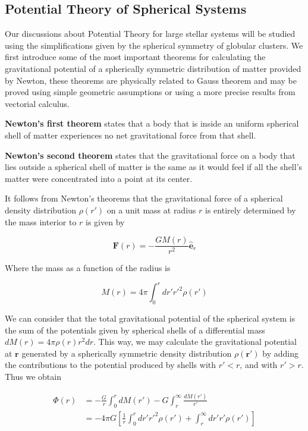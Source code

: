 \subsection{Potential Theory of Spherical Systems}

Our discussions about Potential Theory for large stellar systems will be studied using the simplifications given by the spherical symmetry of globular clusters. We first introduce some of the most important theorems for calculating the gravitational potential of a spherically symmetric distribution of matter provided by Newton, these theorems are physically related to Gauss theorem and may be proved using simple geometric assumptions or using a more precise results from vectorial calculus.

\textbf{Newton's first theorem} states that a body that is inside an uniform spherical shell of matter experiences no net gravitational force from that shell. 

\textbf{Newton's second theorem} states that the gravitational force on a body that lies outside a spherical shell of matter is the same as it would feel if all the shell's matter were concentrated into a point at its center. 

It follows from Newton's theorems that the gravitational force of a spherical density distribution $\rho(r')$ on a unit mass at radius $r$ is entirely determined by the mass interior to $r$ is given by

\begin{equation}
\textbf{F}(r)=-\frac{GM(r)}{r^{2}}\hat{\textbf{e}}_{r}
\end{equation}

Where the mass as a function of the radius is

\begin{equation}
M(r)=4\pi\int_{0}^{r}dr'r'^{2}\rho(r')
\end{equation}

We can consider that the total gravitational potential of the spherical system is the sum of the potentials given by spherical shells of a differential mass $dM(r)=4\pi\rho(r)r^{2}dr$. This way, we may calculate the gravitational potential at $\textbf{r}$ generated by a spherically symmetric density distribution $\rho(\textbf{r}')$ by adding the contributions to the potential produced by shells with $r'<r$, and with $r'>r$. Thus we obtain

\begin{equation}
	\begin{aligned}	
	\Phi(r) &= -\frac{G}{r}\int_{0}^{r}dM(r')-G\int_{r}^{\infty}\frac{dM(r')} {r'}\\      &= -4\pi G\left[\frac{1}{r}\int_{0}^{r}dr'r'^{2}\rho(r')+\int_{r}^{\infty}dr'r'\rho(r')\right]
	\end{aligned}
\end{equation} 

